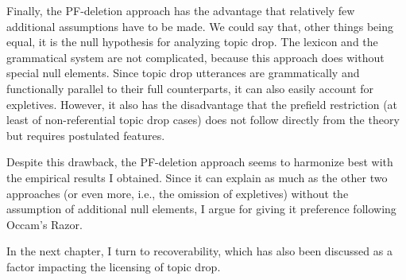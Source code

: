 Finally, the PF-deletion  approach has the advantage that relatively few additional assumptions have to be made.
We could say that, other things being equal, it is the null hypothesis for analyzing topic drop.
The lexicon and the grammatical system are not complicated, because this approach does without special null elements.
Since topic drop utterances are grammatically and functionally parallel to their full counterparts, it can also easily account for expletives. 
However, it also has the disadvantage that the prefield restriction (at least of non-referential topic drop cases) does not follow directly from the theory but requires postulated features.

Despite this drawback, the PF-deletion approach seems to harmonize best with the empirical results I obtained.
Since it can explain as much as the other two approaches (or even more, i.e., the omission of expletives)  without the assumption of additional null elements, I argue for giving it preference following Occam's Razor. 

In the next chapter, I turn to recoverability, which has also been discussed as a factor impacting the licensing of topic drop.

